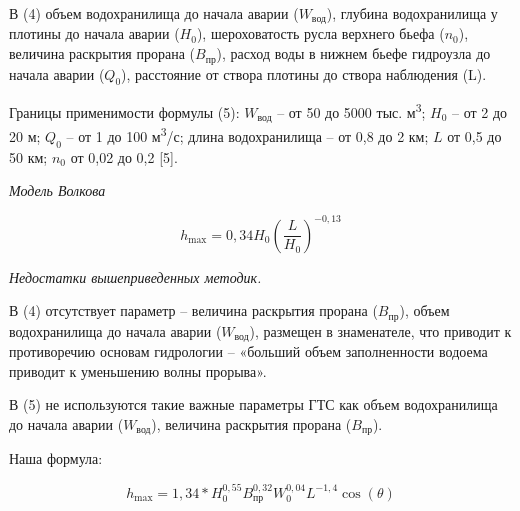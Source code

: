 \begin{multicols}{2}
В (4) объем водохранилища до начала аварии (\(W_{\text{вод}}\)), глубина
водохранилища у плотины до начала аварии (\(H_{0}\)), шероховатость
русла верхнего бьефа (\(n_{0}\)), величина раскрытия прорана
(\(B_{\text{пр}}\)), расход воды в нижнем бьефе гидроузла до начала аварии
(\(Q_{0}\)), расстояние от створа плотины до створа наблюдения (L).

Границы применимости формулы (5): \(W_{\text{вод}}\) -- от 50 до 5000 тыс.
м\textsuperscript{3}; \(H_{0}\) -- от 2 до 20 м; \(Q_{0}\) -- от 1 до
100 м\textsuperscript{3}/с; длина водохранилища -- от 0,8 до 2 км; $L$ от
0,5 до 50 км; \(n_{0}\) от 0,02 до 0,2 {[}5{]}.
\end{multicols}

\emph{Модель Волкова}

\begin{equation}
h_{\max} = 0,34H_{0}\left( \frac{L}{H_{0}} \right)^{- 0,13}
\end{equation}

\emph{Недостатки вышеприведенных методик.}

\begin{multicols}{2}
В (4) отсутствует параметр -- величина раскрытия прорана (\(B_{\text{пр}}\)),
объем водохранилища до начала аварии (\(W_{\text{вод}}\)), размещен в
знаменателе, что приводит к противоречию основам гидрологии -- «больший
объем заполненности водоема приводит к уменьшению волны прорыва».

В (5) не используются такие важные параметры ГТС как объем водохранилища
до начала аварии (\(W_{\text{вод}}\)), величина раскрытия прорана (\(B_{\text{пр}}\)).
\end{multicols}

Наша формула:

\begin{equation}
h_{\max} = 1,34*H_{0}^{0,55}B_{\text{пр}}^{0,32}W_{0}^{0,04}L^{- 1,4}\cos(\theta )
\end{equation}

